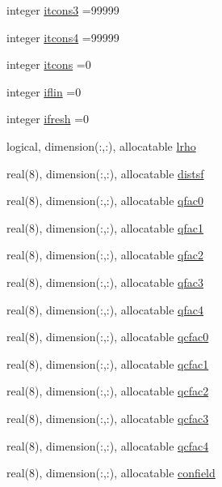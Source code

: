 \begin{DoxyCompactItemize}
\item 
integer \hyperlink{namespaceconstr_a4afb13fcfc904a320758247b7d5b06ea}{itcons3} =99999
\item 
integer \hyperlink{namespaceconstr_a863a7bff97cfb37f8ca4b42156a89e84}{itcons4} =99999
\item 
integer \hyperlink{namespaceconstr_a1c14adff3a21fe2b7dd3805ca890a711}{itcons} =0
\item 
integer \hyperlink{namespaceconstr_ab2fbc57b03ef687dc320a927da5e22a3}{iflin} =0
\item 
integer \hyperlink{namespaceconstr_abc7bfde5d5d47ed18ddc164508cfa1ac}{ifresh} =0
\item 
logical, dimension(\+:,\+:), allocatable \hyperlink{namespaceconstr_acc27ba959f19761e554a08b943b4a8d2}{lrho}
\item 
real(8), dimension(\+:,\+:), allocatable \hyperlink{namespaceconstr_a2aa658d9e448900c74a484233c9c3e65}{distsf}
\item 
real(8), dimension(\+:,\+:), allocatable \hyperlink{namespaceconstr_abe00dd6a7a2fb5c37a87dd62dbcfa67a}{qfac0}
\item 
real(8), dimension(\+:,\+:), allocatable \hyperlink{namespaceconstr_a53efe856c63b5d63637c1aa813a3a205}{qfac1}
\item 
real(8), dimension(\+:,\+:), allocatable \hyperlink{namespaceconstr_a07ecd53eb439059f24f9da31a9261e37}{qfac2}
\item 
real(8), dimension(\+:,\+:), allocatable \hyperlink{namespaceconstr_a6ce54a1e7305b2e04c8db7e4e0b462db}{qfac3}
\item 
real(8), dimension(\+:,\+:), allocatable \hyperlink{namespaceconstr_a362515a302fb05cad337f01df7b447e1}{qfac4}
\item 
real(8), dimension(\+:,\+:), allocatable \hyperlink{namespaceconstr_a6b2a3c58bac912d4a73157efe7676b4c}{qcfac0}
\item 
real(8), dimension(\+:,\+:), allocatable \hyperlink{namespaceconstr_a7e953ba3a87c37edea28ada189132d1b}{qcfac1}
\item 
real(8), dimension(\+:,\+:), allocatable \hyperlink{namespaceconstr_a782673708e19234113cb3f084461832b}{qcfac2}
\item 
real(8), dimension(\+:,\+:), allocatable \hyperlink{namespaceconstr_a7b3aac306329483616d504a65054b8fb}{qcfac3}
\item 
real(8), dimension(\+:,\+:), allocatable \hyperlink{namespaceconstr_af93a2b72075cfd5f649183e392e4f496}{qcfac4}
\item 
real(8), dimension(\+:,\+:), allocatable \hyperlink{namespaceconstr_a862fa5ac4551dc4c5c5bdd92e86b533c}{confield}

\end{DoxyCompactItemize}

